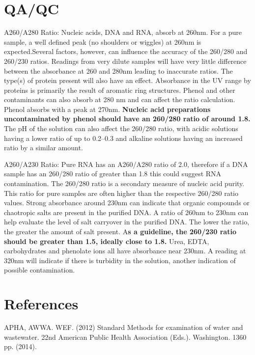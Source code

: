 \documentclass[12pt]{../SOP3_alpha}
\begin{document}
\section{QA/QC}

\NP A260/A280 Ratio: Nucleic acids, DNA and RNA, absorb at 260nm. For a pure sample, a well defined peak (no shoulders or wiggles) at 260nm is expected.Several factors, however, can influence the accuracy of the 260/280 and 260/230 ratios. Readings from very dilute samples will have very little difference between the absorbance at 260 and 280nm leading to inaccurate ratios.  The type(s) of protein present will also have an effect.  Absorbance in the UV range by proteins is primarily the result of aromatic ring structures. Phenol and other contaminants can also absorb at 280 nm and can affect the ratio calculation. Phenol absorbs with a peak at 270nm. \textbf{Nucleic acid preparations uncontaminated by phenol should have an 260/280 ratio of around 1.8.} The pH of the solution can also affect the 260/280 ratio, with acidic solutions having a lower ratio of up to 0.2–0.3 and alkaline solutions having an increased ratio by a similar amount.

\NP A260/A230 Ratio: Pure RNA has an A260/A280 ratio of 2.0, therefore if a DNA sample has an 260/280 ratio of greater than 1.8 this could suggest RNA contamination. The 260/280 ratio is a secondary measure of nucleic acid purity. This ratio for pure samples are often higher than the respective 260/280 ratio values. Strong absorbance around 230nm can indicate that organic compounds or chaotropic salts are present in the purified DNA.  A ratio of 260nm to 230nm can help evaluate the level of salt carryover in the purified DNA. The lower the ratio, the greater the amount of salt present. A\textbf{s a guideline, the 260/230 ratio should be greater than 1.5, ideally close to 1.8. } Urea, EDTA, carbohydrates and phenolate ions all have absorbance near 230nm. A reading at 320nm will indicate if there is turbidity in the solution, another indication of possible contamination. 

\section{References}

\NP APHA, AWWA. WEF. (2012) Standard Methods for examination of water and wastewater. 22nd American Public Health Association (Eds.). Washington. 1360 pp. (2014).
\end{document}
